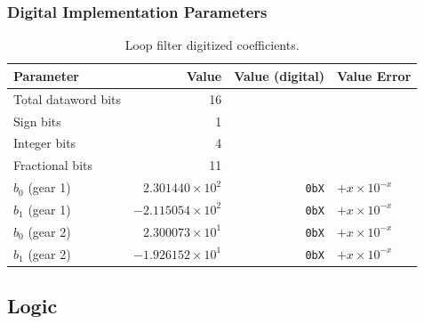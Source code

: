 		\subsubsection{Digital Implementation Parameters}
		\begin{table}[h!]
			\centering
			\def\arraystretch{1.5}		
			\setlength\arrayrulewidth{0.75pt}
			\setlength{\tabcolsep}{1em} %
			\begin{tabular}{|l|r|r|l|}
				\hline 
				\rule[-1ex]{0pt}{2.5ex} \cellcolor{gray!40}\textbf{Parameter} & \cellcolor{gray!40}\textbf{Value} & \cellcolor{gray!40}\textbf{Value (digital) } & \cellcolor{gray!40}\textbf{Value Error}\\ 
				\hline 
				\rule[-1ex]{0pt}{2.5ex} Total dataword bits  & 16 & & \\ 
				\hline 
				\rule[-1ex]{0pt}{2.5ex} Sign bits  & 1 & & \\ 
				\hline 
				\rule[-1ex]{0pt}{2.5ex} Integer bits & 4 & & \\ 
				\hline 
				\rule[-1ex]{0pt}{2.5ex} Fractional bits  & 11 & & \\ 
				\hline 
				\rule[-1ex]{0pt}{2.5ex} \textbf{$b_0$} {\color{red} (gear 1)} & $2.301440\times10^2$ & \texttt{0bX}  & $+x\times10^{-x}$\\
				\hline 
				\rule[-1ex]{0pt}{2.5ex} \textbf{$b_1$} {\color{red} (gear 1)} & $-2.115054\times10^2$ & \texttt{0bX}  & $+x\times10^{-x}$\\
				\hline 
				\rule[-1ex]{0pt}{2.5ex} \textbf{$b_0$} {\color{blue} (gear 2)} & $2.300073\times10^1$ & \texttt{0bX}  & $+x\times10^{-x}$ \\
				\hline 
				\rule[-1ex]{0pt}{2.5ex} \textbf{$b_1$} {\color{blue} (gear 2)} & $-1.926152\times10^1$ & \texttt{0bX}  & $+x\times10^{-x}$\\
				\hline 
			\end{tabular} 
			\caption{Loop filter digitized coefficients.}
			\label{dig_filter_params_fast}
		\end{table}  

\FloatBarrier\subsection{Logic}

